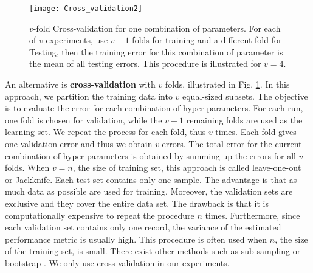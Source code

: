 \begin{figure}[h!]
	\centering
	\texttt{[image: Cross\_validation2]}
	\caption[$v$-fold Cross-validation for one combination of parameters.]{$v$-fold Cross-validation for one combination of parameters. For each of $v$ experiments, use $v-1$ folds for training and a different fold for Testing, then the training error for this combination of parameter is the mean of all testing errors. This procedure is illustrated for $v=4$.}
	\label{fig:Cross_validation}
\end{figure}

An alternative is \textbf{cross-validation} with $v$ folds, illustrated in Fig. \ref{fig:Cross_validation}. In this approach, we partition the training data into $v$ equal-sized subsets. The objective is to evaluate the error for each combination of hyper-parameters. For each run, one fold is chosen for validation, while the $v-1$ remaining folds are used as the learning set. We repeat the process for each fold, thus $v$ times. Each fold gives one validation error and thus we obtain $v$ errors. The total error for the current combination of hyper-parameters is obtained by summing up the errors for all $v$ folds. When $v=n$, the size of training set, this approach is called leave-one-out or Jackknife. Each test set contains only one sample. The advantage is that as much data as possible are used for training. Moreover, the validation sets are exclusive and they cover the entire data set. The drawback is that it is computationally expensive to repeat the procedure $n$ times. Furthermore, since each validation set contains only one record, the variance of the estimated performance metric is usually high. This procedure is often used when $n$, the size of the training set, is small. There exist other methods such as sub-sampling or bootstrap \cite{Duda1973,Dreyfus2006}. We only use cross-validation in our experiments.

